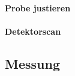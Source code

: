 \paragraph{Probe justieren}


\paragraph{Detektorscan}
















\subsection{Messung}
\label{subsec:messung}



